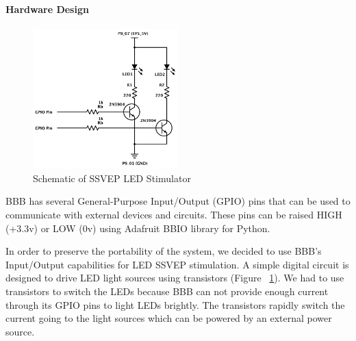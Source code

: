 \documentclass[12pt]{article}
\newcommand\mysubsubsubsection[1]{\paragraph{#1}\hspace{0pt}}
\numberwithin{equation}{section}
\numberwithin{figure}{section}
\numberwithin{table}{section}
\begin{document}
\mysubsubsubsection{Hardware Design}
\par{
    \begin{figure}[ht]
        \centering
        \includegraphics[width=0.5\textwidth]{images/led_circuit}
        \caption{Schematic of SSVEP LED Stimulator}
        \label{fig:bbb_led_schema}
    \end{figure}
    BBB has several General-Purpose Input/Output (GPIO) pins that can be used to communicate with external
    devices and circuits. These pins can be raised HIGH (+3.3v) or LOW (0v)
    using Adafruit BBIO library for Python.
}
\par{
    In order to preserve the portability of the system, we decided to use BBB's
    Input/Output capabilities for LED SSVEP stimulation. A simple digital circuit is designed to
    drive LED light sources using transistors (Figure ~\ref{fig:bbb_led_schema}).
    We had to use transistors to switch the LEDs because BBB can not provide enough current
    through its GPIO pins to light LEDs brightly. The transistors rapidly switch
    the current going to the light sources which can be powered by an external power source.
}
\end{document}
